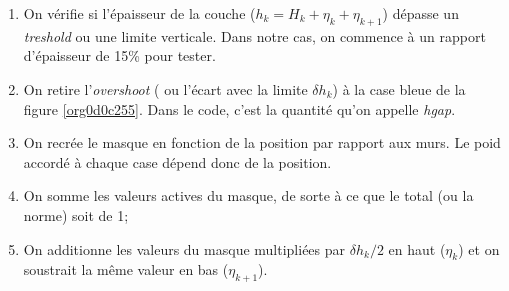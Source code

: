 \documentclass[10pt]{article}
\numberwithin{equation}{section}
\begin{document}
\begin{enumerate}
\item On vérifie si l'épaisseur de la couche (\(h_k = H_k + \eta_k + \eta_{k+1}\)) dépasse un \emph{treshold} ou une limite verticale.
Dans notre cas, on commence à un rapport d'épaisseur de 15\% pour tester.
\item On retire l'\emph{overshoot} ( ou l'écart avec la limite \(\delta h_k\)) à la case bleue de la figure \ref{org0d0c255}.
Dans le code, c'est la quantité qu'on appelle \emph{hgap}.
\item On recrée le masque en fonction de la position par rapport aux murs.
Le poid accordé à chaque case dépend donc de la position.
\item On somme les valeurs actives du masque, de sorte à ce que le total (ou la norme) soit de 1;
\item On additionne les valeurs du masque multipliées par \(\delta h_k/2\) en haut (\(\eta_k\)) et on soustrait la même valeur en bas (\(\eta_{k+1}\)).
\end{enumerate}
\end{document}
